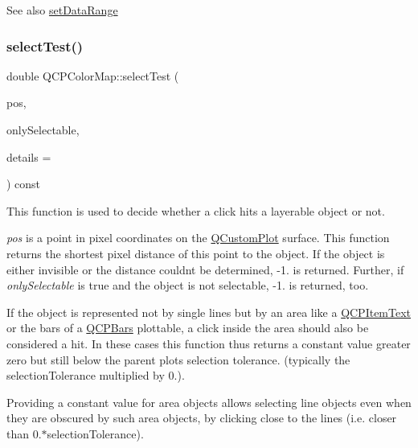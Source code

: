 \begin{DoxySeeAlso}{See also}
\hyperlink{class_q_c_p_color_map_a980b42837821159786a85b4b7dcb8774}{set\+Data\+Range} 
\end{DoxySeeAlso}
\mbox{\label{class_q_c_p_color_map_afb4b843596addf58096082827a9e3450}} 
\subsubsection{\texorpdfstring{select\+Test()}{selectTest()}}
{\footnotesize\ttfamily double Q\+C\+P\+Color\+Map\+::select\+Test (\begin{DoxyParamCaption}\item[{const Q\+PointF \&}]{pos,  }\item[{bool}]{only\+Selectable,  }\item[{Q\+Variant $\ast$}]{details = {} }\end{DoxyParamCaption}) const\hspace{0.3cm}{\ttfamily [virtual]}}

This function is used to decide whether a click hits a layerable object or not.

{\itshape pos} is a point in pixel coordinates on the \hyperlink{class_q_custom_plot}{Q\+Custom\+Plot} surface. This function returns the shortest pixel distance of this point to the object. If the object is either invisible or the distance couldn\textquotesingle{}t be determined, -\/1. is returned. Further, if {\itshape only\+Selectable} is true and the object is not selectable, -\/1. is returned, too.

If the object is represented not by single lines but by an area like a \hyperlink{class_q_c_p_item_text}{Q\+C\+P\+Item\+Text} or the bars of a \hyperlink{class_q_c_p_bars}{Q\+C\+P\+Bars} plottable, a click inside the area should also be considered a hit. In these cases this function thus returns a constant value greater zero but still below the parent plot\textquotesingle{}s selection tolerance. (typically the selection\+Tolerance multiplied by 0.).

Providing a constant value for area objects allows selecting line objects even when they are obscured by such area objects, by clicking close to the lines (i.\+e. closer than 0.$\ast$selection\+Tolerance).

